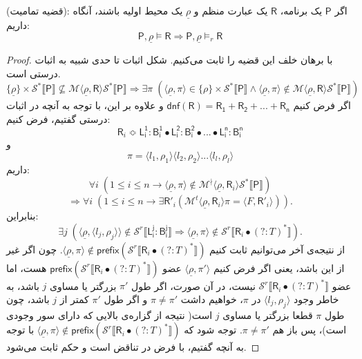 \begin{thm}

	(قضیه تمامیت): اگر $\mathsf{P}$ یک برنامه، $\mathsf{R}$ یک عبارت منظم و $\underline{\rho}$ یک محیط اولیه باشند، آنگاه داریم:
$$\mathsf{P},\underline{\rho} \models \mathsf{R} \Rightarrow
\mathsf{P},\underline{\rho} \models_r \mathsf{R}$$
\end{thm}
\begin{proof}
	با برهان خلف این قضیه را ثابت می‌کنیم. شکل اثبات تا حدی شبیه به اثبات درستی است.
	$$\{\underline{\rho}\}\times \mathcal{S}^* \llbracket \mathsf{P} \rrbracket \nsubseteq \mathcal{M}\langle \underline{\rho}, \mathsf{R} \rangle \mathcal{S}^* \llbracket \mathsf{P} \rrbracket \Rightarrow
	\exists \pi\;(\langle \underline{\rho}, \pi \rangle \in \{\rho\}\times \mathcal{S}^* \llbracket \mathsf{P}\rrbracket \land \langle \underline{\rho}, \pi \rangle \notin \mathcal{M}\langle \underline{\rho},\mathsf{R}\rangle\mathcal{S}^* \llbracket \mathsf{P} \rrbracket)$$
	اگر فرض کنیم
	$\mathsf{dnf(R)=R_1+R_2+...+R_n}$
	و علاوه بر این، با توجه به آنچه در اثبات درستی گفتیم، فرض کنیم:
	$$\mathsf{R}_i \Bumpeq \mathsf{L_i^1:B_i^1 \bullet L_i^2:B_i^2 \bullet ... \bullet L_i^n:B_i^n}$$ 
	و
	$$\pi=\langle l_1 ,\rho_1 \rangle \langle l_2 ,\rho_2 \rangle ... \langle l_l ,\rho_l \rangle$$
	داریم:
	$$\forall i\;(1 \leq i \leq n \rightarrow 
	\langle \underline{\rho}, \pi \rangle \notin \mathcal{M}^\nmid \langle \underline{\rho}, \mathsf{R}_i \rangle \mathcal{S}^* \llbracket \mathsf{P} \rrbracket)$$
	$$\Rightarrow\forall i \;(1 \leq i \leq n \rightarrow\exists \mathsf{R'}_i (\mathcal{M}^t \langle \underline{\rho},\mathsf{R}_i \rangle \pi = \langle \mathit{F},\mathsf{R'}_i \rangle)).$$
	بنابراین:
	$$\exists j\; (\langle \underline{\rho},\langle l_j,\rho_j \rangle \rangle \notin \mathcal{S}^r \llbracket \mathsf{L_i^j:B_i^j} \rrbracket
	\Rightarrow \langle \underline{\rho},\pi \rangle \notin \mathcal {S}^r \llbracket \mathsf{R}_i \bullet (?:\mathit{T})^* \rrbracket).$$
	از نتیجه‌ی آخر می‌توانیم ثابت کنیم 
	$\langle \underline{\rho},\pi \rangle \notin \mathsf{prefix}(\mathcal {S}^r \llbracket \mathsf{R}_i \bullet (?:\mathit{T})^* \rrbracket)$.
	چون اگر غیر از این باشد، یعنی اگر فرض کنیم 
	$\langle \underline{\rho}, \pi' \rangle$
	 عضو 
	 $\mathsf{prefix}(\mathcal {S}^r \llbracket \mathsf{R}_i \bullet (?:\mathit{T})^* \rrbracket)$
	 هست، اما عضو \break
	 $\mathcal {S}^r \llbracket \mathsf{R}_i \bullet (?:\mathit{T})^* \rrbracket$
	 نیست، در آن صورت، اگر طول $\pi'$ بزرگتر یا مساوی $j$ باشد، به خاطر وجود 
	 $\langle l_j,\rho_j \rangle$
	 در $\pi$، خواهیم داشت $\pi \neq \pi'$ و اگر طول $\pi'$ کمتر از $j$ باشد، چون طول $\pi$ قطعا بزرگتر یا مساوی $j$ است( نتیجه از گزاره‌ی بالایی که دارای سور وجودی است)، پس باز هم 
	 $\pi \neq \pi'$.
	 توجه شود که 
	 $\langle \underline{\rho},\pi \rangle \notin \mathsf{prefix}( \mathcal {S}^r \llbracket \mathsf{R}_i \bullet (?:\mathit{T})^* \rrbracket)$
	 با توجه به آنچه گفتیم، با فرض در تناقض است و حکم ثابت می‌شود.
\end{proof}















